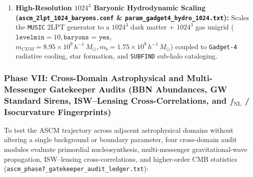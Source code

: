 \documentclass[aps,prd,onecolumn,superscriptaddress,nofootinbib,longbibliography,10pt]{revtex4-2}
\begin{document}
\begin{enumerate}
\item \textbf{High-Resolution \(1024^3\) Baryonic Hydrodynamic Scaling (\texttt{ascm_2lpt_1024_baryons.conf} \& \texttt{param_gadget4_hydro_1024.txt}):} Scales the \texttt{MUSIC} 2LPT generator to a \(1024^3\) dark matter + \(1024^3\) gas unigrid (\(\texttt{levelmin} = 10, \texttt{baryons = yes}\), \(m_{CDM} = 8.95 \times 10^9\,h^{-1}\,M_\odot, m_b = 1.75 \times 10^9\,h^{-1}\,M_\odot\)) coupled to \texttt{Gadget-4} radiative cooling, star formation, and \texttt{SUBFIND} sub-halo cataloging.

\end{enumerate}




\subsubsection*{Phase VII: Cross-Domain Astrophysical and Multi-Messenger Gatekeeper Audits (BBN Abundances, GW Standard Sirens, ISW–Lensing Cross-Correlations, and \(f_{\mathrm{NL}}\) / Isocurvature Fingerprints)}

To test the ASCM trajectory across adjacent astrophysical domains without altering a single background or boundary parameter, four cross-domain audit modules evaluate primordial nucleosynthesis, multi-messenger gravitational-wave propagation, ISW–lensing cross-correlations, and higher-order CMB statistics (\texttt{ascm_phase7_gatekeeper_audit_ledger.txt}):
\end{document}

